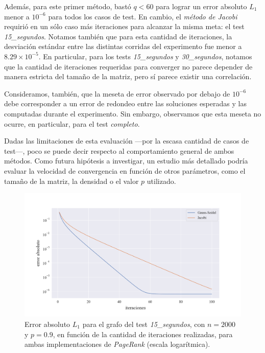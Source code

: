 \vspace{1em}
Además, para este primer método, bastó $q < 60$ para lograr un error absoluto $L_1$ menor a $10^{-6}$ para todos los casos de test. En cambio, el \textit{método de Jacobi} requirió en un sólo caso más iteraciones para alcanzar la misma meta: el test \textit{15\_segundos}. Notamos también que para esta cantidad de iteraciones, la desviación estándar entre las distintas corridas del experimento fue menor a $8.29 \times 10^{-5}$. En particular, para los tests \textit{15\_segundos} y \textit{30\_segundos}, notamos que la cantidad de iteraciones requeridas para converger no parece depender de manera estricta del tamaño de la matriz, pero sí parece existir una correlación. 

\vspace{1em}
Consideramos, también, que la meseta de error observado por debajo de $10^{-6}$ debe corresponder a un error de redondeo entre las soluciones esperadas y las computadas durante el experimento. Sin embargo, observamos que esta meseta no ocurre, en particular, para el test \textit{completo}.

\vspace{1em}
Dadas las limitaciones de esta evaluación ---por la escasa cantidad de casos de test---, poco se puede decir respecto al comportamiento general de ambos métodos. Como futura hipótesis a investigar, un estudio más detallado podría evaluar la velocidad de convergencia en función de otros parámetros, como el tamaño de la matriz, la densidad o el valor $p$ utilizado. 

\begin{figure}[!htbp]
    \centering
    \includegraphics[width=.9\textwidth]{files/src/.media/convergencia_test_15_segundos.png}
    \caption{Error absoluto $L_1$ para el grafo del test \textit{15\_segundos}, con $n = 2000$ y $p = 0.9$, en función de la cantidad de iteraciones realizadas, para ambas implementaciones de \textit{PageRank} (escala logarítmica).} \label{test_15_segundos}
\end{figure}


